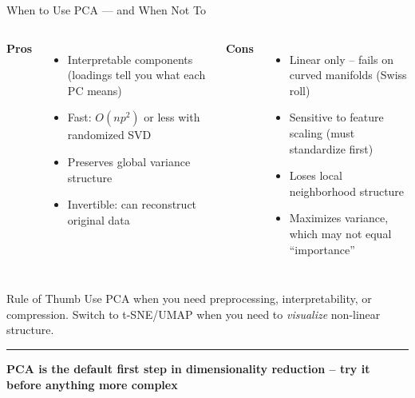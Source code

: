 \documentclass[8pt,aspectratio=169]{beamer}
\newcommand{\bottomnote}[1]{%
\vfill
\vspace{-2mm}
\textcolor{mllavender2}{\rule{\textwidth}{0.4pt}}
\vspace{1mm}
\footnotesize
\textbf{#1}
}
\newenvironment{compactlist}{%
  \begin{itemize}%
    \setlength{\itemsep}{2pt}%
    \setlength{\parskip}{0pt}%
    \setlength{\parsep}{0pt}%
}{%
  \end{itemize}%
}
\begin{document}
\begin{frame}[t]{When to Use PCA --- and When Not To}
\begin{columns}[T]
\small
\textbf{\textcolor{mlgreen}{Pros}}
\begin{compactlist}
\item Interpretable components (loadings tell you what each PC means)
\item Fast: $O(np^2)$ or less with randomized SVD
\item Preserves global variance structure
\item Invertible: can reconstruct original data
\end{compactlist}

\small
\textbf{\textcolor{mlred}{Cons}}
\begin{compactlist}
\item Linear only -- fails on curved manifolds (Swiss roll)
\item Sensitive to feature scaling (must standardize first)
\item Loses local neighborhood structure
\item Maximizes variance, which may not equal ``importance''
\end{compactlist}
\end{columns}

\vspace{3mm}
\begin{block}{Rule of Thumb}
\scriptsize Use PCA when you need preprocessing, interpretability, or compression. Switch to t-SNE/UMAP when you need to \emph{visualize} non-linear structure.
\end{block}

\bottomnote{PCA is the default first step in dimensionality reduction -- try it before anything more complex}
\end{frame}
\end{document}
